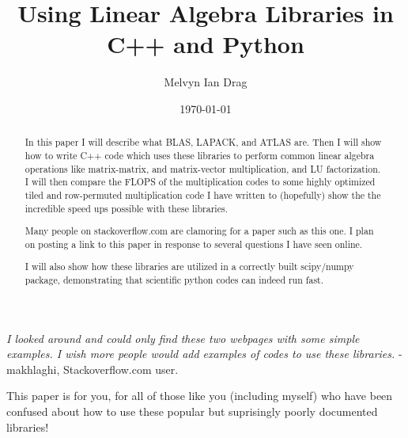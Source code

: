 \documentclass[11pt]{report}
\title{\textbf{Using Linear Algebra Libraries in C++ and Python}}
\author{Melvyn Ian Drag}
\date{\today}
\begin{document}
\maketitle
\begin{abstract}
In this paper I will describe what BLAS, LAPACK, and ATLAS are. Then I will show how to write C++ code which uses these libraries to perform common linear algebra operations like matrix-matrix, and matrix-vector multiplication, and LU factorization. I will then compare the FLOPS of the multiplication codes to some highly optimized tiled and row-permuted multiplication code I have written to (hopefully) show the the incredible speed ups possible with these libraries. 

Many people on stackoverflow.com are clamoring for a paper such as this one. I plan on posting a link to this paper in response to several questions I have seen online.

I will also show how these libraries are utilized in a correctly built scipy/numpy  package, demonstrating that scientific python codes can indeed run fast.
\end{abstract}
 \clearpage
 \emph{I looked around and could only find these two webpages with some simple examples. I wish more people would add examples of codes to use these libraries. }- makhlaghi, Stackoverflow.com user.\\
\begin{center}
This paper is for you, for all of those like you (including myself) who have been confused about how to use these popular but suprisingly poorly documented libraries!
\end{center}
\restoregeometry
 \tableofcontents{}



\end{document}

